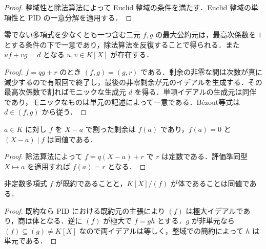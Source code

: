 \begin{proof}
整域性と除法算法によって Euclid 整域の条件を満たす．Euclid 整域の単項性と PID の一意分解を適用する．
\end{proof}
\begin{prop}[多項式の互除法]
零でない多項式を少なくとも一つ含む二元 $f,g$ の最大公約元は，最高次係数を $1$ とする条件の下で一意であり，除法算法を反復することで得られる．また $uf+vg=d$ となる $u,v\in K[X]$ が存在する．
\end{prop}
\begin{proof}
$f=qg+r$ のとき $(f,g)=(g,r)$ である．剰余の非零な間は次数が真に減少するので有限回で終了し，最後の非零剰余が元のイデアルを生成する．その最高次係数で割ればモニックな生成元 $d$ を得る．単項イデアルの生成元は同伴であり，モニックなものは単元の記述によって一意である．Bézout等式は $d\in(f,g)$ から従う．
\end{proof}
\begin{prop}[剰余と根の判定]
$a\in K$ に対し $f$ を $X-a$ で割った剰余は $f(a)$ であり，$f(a)=0$ と $(X-a)\mid f$ は同値である．
\end{prop}
\begin{proof}
除法算法によって $f=q(X-a)+r$ で $r$ は定数である．評価準同型 $X\mapsto a$ を適用すれば $f(a)=r$ となる．
\end{proof}
\begin{prop}[既約多項式と剰余体]
非定数多項式 $f$ が既約であることと，$K[X]/(f)$ が体であることは同値である．
\end{prop}
\begin{proof}
既約なら PID における既約元の主張により $(f)$ は極大イデアルであり，商は体となる．逆に $(f)$ が極大で $f=gh$ とする．$g$ が非単元なら $(f)\subseteq(g)\ne K[X]$ なので両イデアルは等しく，整域での簡約によって $h$ は単元である．
\end{proof}
